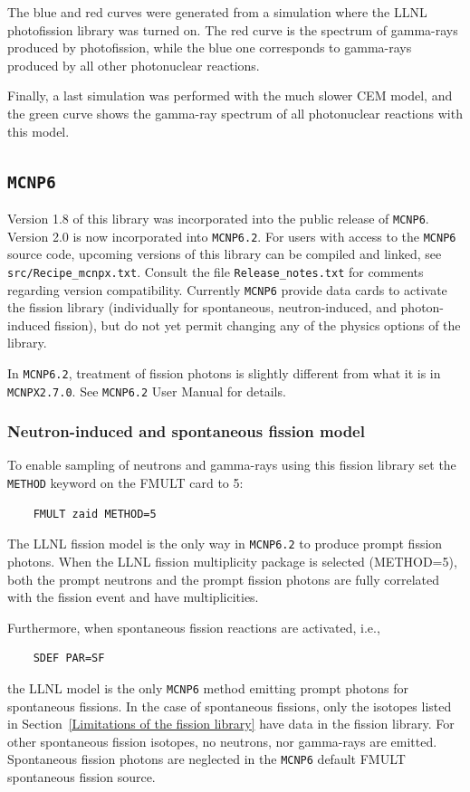 The blue and red curves were generated from a simulation where the LLNL photofission library was turned on. The red curve is the spectrum of gamma-rays produced by photofission, while the blue one corresponds to gamma-rays produced by all other photonuclear reactions.

Finally, a last simulation was performed with the much slower CEM model, and the green curve shows the gamma-ray spectrum of all photonuclear reactions with this model.

\subsection{{\tt MCNP6}}\label{sec:mcnp}

Version 1.8 of this library was incorporated into the public release of {\tt MCNP6}. Version 2.0 is now incorporated into {\tt MCNP6.2}. For users with access to the {\tt MCNP6} source code, upcoming versions of this library can be compiled and linked, see \texttt{src/Recipe\_mcnpx.txt}. Consult the file \texttt{Release\_notes.txt} for comments regarding version compatibility.
Currently {\tt MCNP6} provide data cards to activate the fission library (individually for spontaneous, neutron-induced, and photon-induced fission), but do not yet permit changing any of the physics options of the library. 

In {\tt MCNP6.2}, treatment of fission photons is slightly different from what it is in {\tt MCNPX2.7.0}. See {\tt MCNP6.2} User Manual for details.

\subsubsection*{Neutron-induced and spontaneous fission model}

To enable sampling of neutrons and gamma-rays using this fission library set the {\tt METHOD} keyword on the FMULT card
to 5:
\begin{verbatim}
	FMULT zaid METHOD=5
\end{verbatim}
The LLNL fission model is the only way in {\tt MCNP6.2} to produce prompt fission photons. When the LLNL fission multiplicity package is selected (METHOD=5), both the prompt neutrons and the prompt fission photons are fully correlated with the fission event and have multiplicities.

Furthermore, when spontaneous fission reactions are activated, i.e.,
\begin{verbatim}
	SDEF PAR=SF
\end{verbatim}
the LLNL model is the only {\tt MCNP6} method emitting prompt photons for spontaneous fissions. In the case of spontaneous fissions, only the isotopes listed in Section~\ref{Limitations of the fission library} have data in the fission library. For other spontaneous fission isotopes, no neutrons, nor gamma-rays are emitted. Spontaneous fission photons are neglected in the {\tt MCNP6} default FMULT spontaneous fission source.

